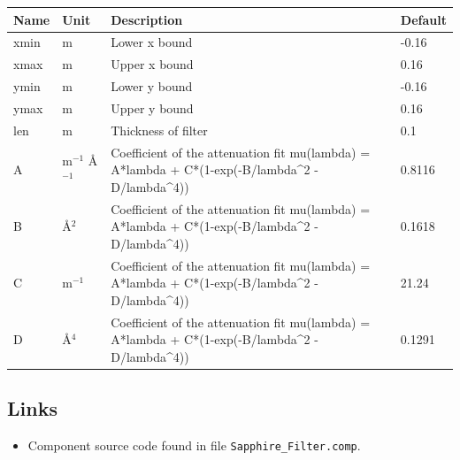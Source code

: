 \begin{longtable}{p{}p{}p{}p{}}
\toprule
\textbf{Name} & \textbf{Unit} & \textbf{Description} & \textbf{Default} \\
\midrule
\endhead
xmin & m & Lower x bound & -0.16 \\
xmax & m & Upper x bound & 0.16 \\
ymin & m & Lower y bound & -0.16 \\
ymax & m & Upper y bound & 0.16 \\
len & m & Thickness of filter & 0.1 \\
A & m$^{-1}$ \AA{}$^{-1}$ & Coefficient of the attenuation fit mu(lambda) = A*lambda + C*(1-exp(-B/lambda\textasciicircum{}2 - D/lambda\textasciicircum{}4)) & 0.8116 \\
B & \AA{}$^{2}$ & Coefficient of the attenuation fit mu(lambda) = A*lambda + C*(1-exp(-B/lambda\textasciicircum{}2 - D/lambda\textasciicircum{}4)) & 0.1618 \\
C & m$^{-1}$ & Coefficient of the attenuation fit mu(lambda) = A*lambda + C*(1-exp(-B/lambda\textasciicircum{}2 - D/lambda\textasciicircum{}4)) & 21.24 \\
D & \AA{}$^{4}$ & Coefficient of the attenuation fit mu(lambda) = A*lambda + C*(1-exp(-B/lambda\textasciicircum{}2 - D/lambda\textasciicircum{}4)) & 0.1291 \\
\bottomrule
\end{longtable}

\subsection*{Links}
\begin{itemize}
  \item Component source code found in file \texttt{Sapphire\_Filter.comp}.
\end{itemize}
